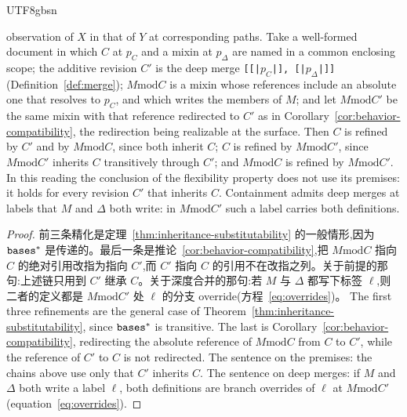 \begin{CJK*}{UTF8}{gbsn}
\begin{corollary}
observation of $X$ in that of $Y$ at corresponding paths. Take a well-formed document in which $C$ at
$p_C$ and a mixin at $p_\Delta$ are named in a common enclosing scope; the additive revision $C'$ is the
deep merge \texttt{[[|$p_C$|], [|$p_\Delta$|]]} (Definition~\ref{def:merge});
$M \mathbin{\mathrm{mod}} C$ is a mixin whose references include an absolute one that resolves to $p_C$, and
which writes the members of $M$; and let $M \mathbin{\mathrm{mod}} C'$ be the same mixin with that reference
redirected to $C'$ as in Corollary~\ref{cor:behavior-compatibility}, the redirection being realizable at
the surface. Then $C$ is refined by $C'$ and by $M \mathbin{\mathrm{mod}} C$, since both inherit $C$; $C$ is
refined by $M \mathbin{\mathrm{mod}} C'$, since $M \mathbin{\mathrm{mod}} C'$ inherits $C$ transitively through $C'$; and
$M \mathbin{\mathrm{mod}} C$ is refined by $M \mathbin{\mathrm{mod}} C'$. In this reading the conclusion of the flexibility
property does not use its premises: it holds for every revision $C'$ that inherits $C$. Containment
admits deep merges at labels that $M$ and $\Delta$ both write: in $M \mathbin{\mathrm{mod}} C'$ such a label carries
both definitions.
\fi
\end{corollary}

\begin{proof}
\ifPaperChinese
前三条精化是定理~\ref{thm:inheritance-substitutability} 的一般情形,因为 $\mathtt{bases}^*$ 是传递的。最后一条是推论~\ref{cor:behavior-compatibility},把 $M \mathbin{\mathrm{mod}} C$ 指向 $C$ 的绝对引用改指为指向 $C'$,而 $C'$ 指向 $C$ 的引用不在改指之列。关于前提的那句:上述链只用到 $C'$ 继承 $C$。关于深度合并的那句:若 $M$ 与 $\Delta$ 都写下标签 $\ell$,则二者的定义都是 $M \mathbin{\mathrm{mod}} C'$ 处 $\ell$ 的分支 override(方程~\eqref{eq:overrides})。
\else
The first three refinements are the general case of Theorem~\ref{thm:inheritance-substitutability},
since $\mathtt{bases}^*$ is transitive. The last is Corollary~\ref{cor:behavior-compatibility}, redirecting the
absolute reference of $M \mathbin{\mathrm{mod}} C$ from $C$ to $C'$, while the reference of $C'$ to $C$ is not
redirected. The sentence on the premises: the chains above use only that $C'$ inherits $C$. The
sentence on deep merges: if $M$ and $\Delta$ both write a label $\ell$, both definitions are branch
overrides of $\ell$ at $M \mathbin{\mathrm{mod}} C'$ (equation~\eqref{eq:overrides}).
\fi
\end{proof}

\section{}
\label{app:levy-longo-tree-proofs}


\end{CJK*}
